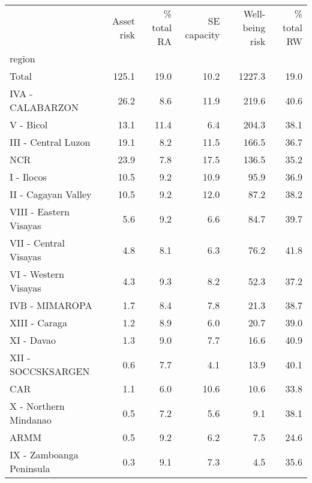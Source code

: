 \begin{tabular}{lrrrrr}
\toprule
{} &  Asset risk &  \% total RA &  SE capacity &  Well-being risk &  \% total RW \\
region                   &             &             &              &                  &             \\
\midrule
Total                    &       125.1 &        19.0 &         10.2 &           1227.3 &        19.0 \\
IVA - CALABARZON         &        26.2 &         8.6 &         11.9 &            219.6 &        40.6 \\
V - Bicol                &        13.1 &        11.4 &          6.4 &            204.3 &        38.1 \\
III - Central Luzon      &        19.1 &         8.2 &         11.5 &            166.5 &        36.7 \\
NCR                      &        23.9 &         7.8 &         17.5 &            136.5 &        35.2 \\
I - Ilocos               &        10.5 &         9.2 &         10.9 &             95.9 &        36.9 \\
II - Cagayan Valley      &        10.5 &         9.2 &         12.0 &             87.2 &        38.2 \\
VIII - Eastern Visayas   &         5.6 &         9.2 &          6.6 &             84.7 &        39.7 \\
VII - Central Visayas    &         4.8 &         8.1 &          6.3 &             76.2 &        41.8 \\
VI - Western Visayas     &         4.3 &         9.3 &          8.2 &             52.3 &        37.2 \\
IVB - MIMAROPA           &         1.7 &         8.4 &          7.8 &             21.3 &        38.7 \\
XIII - Caraga            &         1.2 &         8.9 &          6.0 &             20.7 &        39.0 \\
XI - Davao               &         1.3 &         9.0 &          7.7 &             16.6 &        40.9 \\
XII - SOCCSKSARGEN       &         0.6 &         7.7 &          4.1 &             13.9 &        40.1 \\
CAR                      &         1.1 &         6.0 &         10.6 &             10.6 &        33.8 \\
X - Northern Mindanao    &         0.5 &         7.2 &          5.6 &              9.1 &        38.1 \\
ARMM                     &         0.5 &         9.2 &          6.2 &              7.5 &        24.6 \\
IX - Zamboanga Peninsula &         0.3 &         9.1 &          7.3 &              4.5 &        35.6 \\
\bottomrule
\end{tabular}
